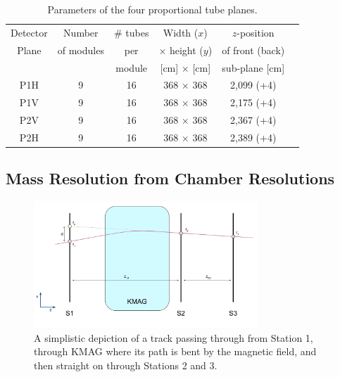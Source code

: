 \begin{table}[bthp]\centering
	\begin{tabular}{c|ccccc}
		\hline \hline
		Detector & Number   	& \# tubes 	& Width ($x$)           	& $z$-position \\
		Plane	 & of modules	& per	 	& $\times$ height ($y$)  	& of front (back)   \\ 
				 &    		    & module  	& [cm] $\times$ [cm]		& sub-plane	[cm]    \\ 
		\hline
		P1H    &  9     & 16  & 368 $\times$ 368 &  2,099 (+4)    \\
		P1V    &  9     & 16  & 368 $\times$ 368 &  2,175 (+4)    \\
		P2V    &  9     & 16  & 368 $\times$ 368 &  2,367 (+4)    \\
		P2H    &  9		& 16  & 368 $\times$ 368 &  2,389 (+4)    \\
		\hline
		\hline
	\end{tabular}
	\caption{Parameters of the four proportional tube planes.}
	\label{table:prop:param}
\end{table}

\subsection{Mass Resolution from Chamber Resolutions}

\begin{figure}
	\centering
	\includegraphics[width=0.75\textwidth]{figures/momentum-resolution.pdf}
	\caption{A simplistic depiction of a track passing through from Station 1, through KMAG where its path is bent by the magnetic field, and then straight on through Stations 2 and 3.}
	\label{fig:mom-res}
\end{figure}

